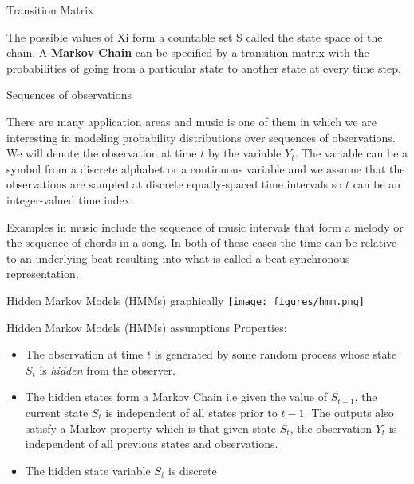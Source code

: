 \documentclass[12pt]{beamer}
\begin{document}
\begin{frame}{Transition Matrix}
  
The possible values of Xi form a countable set S called the state
space of the chain. A {\bf Markov Chain} can be specified by a
transition matrix with the probabilities of going from a particular
state to another state at every time step.

  \end{frame} 


\begin{frame}{Sequences of observations}

  There are many application areas and music is one of them in which
  we are interesting in modeling probability distributions over
  sequences of observations. We will denote the observation at time
  $t$ by the variable $Y_t$. The variable can be a symbol from a
  discrete alphabet or a continuous variable and we assume that the
  observations are sampled at discrete equally-spaced time intervals
  so $t$ can be an integer-valued time index. 

  Examples in music include the sequence of music intervals that form
  a melody or the sequence of chords in a song. In both of these cases
  the time can be relative to an underlying beat resulting into what is
  called a beat-synchronous representation. 
  

  
\end{frame}


\begin{frame}{Hidden Markov Models (HMMs) graphically} 
\texttt{[image: figures/hmm.png]}
\end{frame}

\begin{frame}{Hidden Markov Models (HMMs) assumptions} 
  Properties:
  \begin{itemize}
    \item The observation at time $t$ is generated by some random
      process whose state $S_t$ is {\it hidden} from the observer.
    \item The hidden states form a Markov Chain i.e given the value
      of $S_{t-1}$, the current state $S_t$ is independent of all
      states prior to $t-1$. The outputs also satisfy a Markov property
      which is that given state $S_t$, the observation $Y_t$ is independent
      of all previous states and observations. 
      \item The hidden state variable $S_t$ is discrete
    \end{itemize} 

\end{frame}
\end{document}
